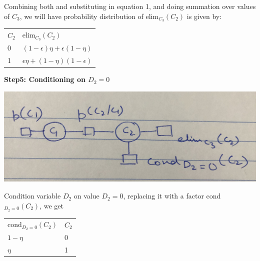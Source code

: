 \documentclass[12pt]{article}
\begin{document}
\begin{enumerate}[label=(\alph*)]
  Combining both and substituting in equation 1, and doing summation over values of $C_3$, we will have probability distribution of elim$_{C_3}(C_2)$ is given by:
  \begin{center}
  \begin{tabular}{ll}
  $C_2$ & elim$_{C_3}(C_2)$                               \\
  0  & $(1 - \epsilon) \eta + \epsilon (1- \eta)$   \\
  1  & $\epsilon \eta + (1- \eta) (1 - \epsilon)$ 
  \end{tabular}
  \end{center}
  
  \textbf{Step5: Conditioning on $D_2 = 0$} \\
  \begin{center}
  \includegraphics[scale=0.1]{IMG_2282.jpg}
  \end{center}
  Condition variable $D_2$ on value $D_2 = 0$, replacing it with a factor cond$_{D_2 = 0}(C_2)$, we get
  \begin{center}
  \begin{tabular}{ll}
  cond$_{D_2 = 0}(C_2)$ & $C_2$  \\
  $1-\eta$            & 0       \\
  $\eta$               & 1       \\
  \end{tabular} \newline \\
  \end{center}
  

\end{enumerate}
\end{document}
